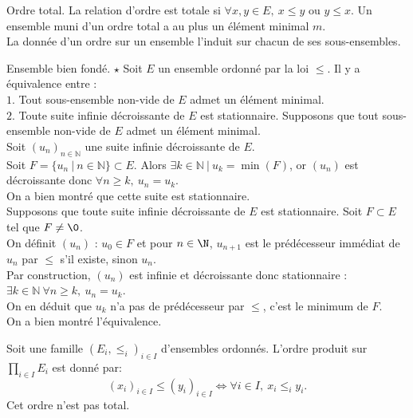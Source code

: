 \documentclass[french, 11pt]{article}
\begin{document}
\begin{defi}{Ordre total.}{}
    La relation d'ordre est totale si $\forall x,y\in E, ~ x\leq y$ ou $y \leq x$.\n
    Un ensemble muni d'un ordre total a au plus un élément minimal $m$.\\
    La donnée d'un ordre sur un ensemble l'induit sur chacun de ses sous-ensembles.
\end{defi}

\begin{prop}{Ensemble bien fondé. $\star$}{}
    Soit $E$ un ensemble ordonné par la loi $\leq$. Il y a équivalence entre :\\
    \hspace*{2em}$1.$ Tout sous-ensemble non-vide de $E$ admet un élément minimal.\\
    \hspace*{2em}$2.$ Toute suite infinie décroissante de $E$ est stationnaire.
    \tcblower
    \fbox{$\ra$} Supposons que tout sous-ensemble non-vide de $E$ admet un élément minimal.\\
    Soit $(u_n)_{n\in\mathbb{N}}$ une suite infinie décroissante de $E$.\\
    Soit $F=\{u_n ~ | ~ n \in \mathbb{N}\}\subset E$. Alors $\exists k \in \mathbb{N} ~ | ~ u_k = \min(F)$, or $(u_n)$ est décroissante donc $\forall n \geq k, ~ u_n = u_k$.\\
    On a bien montré que cette suite est stationnaire.\\[0.2cm]
    \fbox{$\la$} Supposons que toute suite infinie décroissante de $E$ est stationnaire. Soit $F\subset E$ tel que $F \neq \0$.\\
    On définit $(u_n)$ : $u_0 \in F$ et pour $n\in\N$, $u_{n+1}$ est le prédécesseur immédiat de $u_n$ par $\leq$ s'il existe, sinon $u_n$.\\
    Par construction, $(u_n)$ est infinie et décroissante donc stationnaire : $\exists k \in \mathbb{N} ~ \forall n \geq k, ~ u_n = u_k$.\\
    On en déduit que $u_k$ n'a pas de prédécesseur par $\leq$, c'est le minimum de $F$.\\
    On a bien montré l'équivalence.
\end{prop}

\vspace*{-0.5cm}

\begin{defi}{}{}
    Soit une famille $(E_i,\leq_i)_{i\in I}$ d'ensembles ordonnés. L'ordre produit sur $\prod_{i\in I}E_i$ est donné par:
    \begin{equation*}
        (x_i)_{i\in I}\leq (y_i)_{i\in I} \iff \forall i \in I, ~ x_i \leq_i y_i.
    \end{equation*}
    Cet ordre n'est pas total.
\end{defi}
\end{document}

